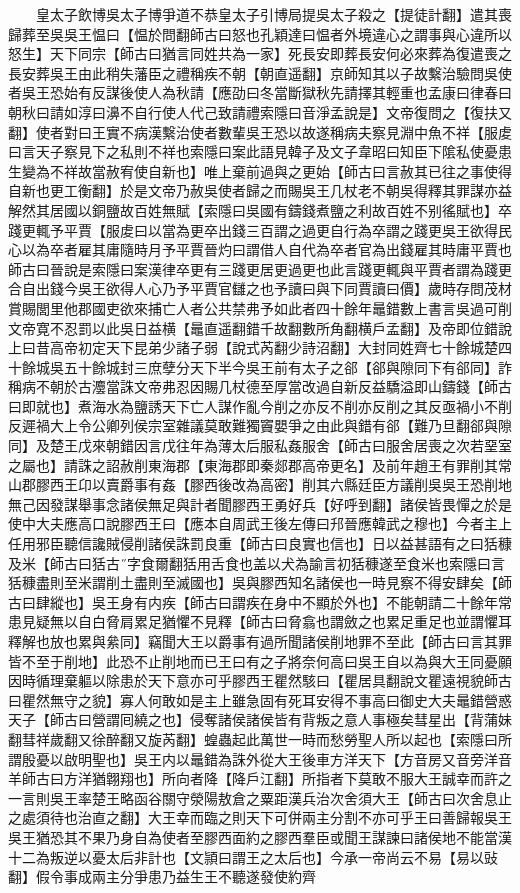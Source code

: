 　　皇太子飲博吳太子博爭道不恭皇太子引博局提吳太子殺之【提徒計翻】遣其喪歸葬至吳吳王愠曰【愠於問翻師古曰怒也孔穎達曰愠者外境違心之謂事與心違所以怒生】天下同宗【師古曰猶言同姓共為一家】死長安即葬長安何必來葬為復遣喪之長安葬吳王由此稍失藩臣之禮稱疾不朝【朝直遥翻】京師知其以子故繫治驗問吳使者吳王恐始有反謀後使人為秋請【應劭曰冬當斷獄秋先請擇其輕重也孟康曰律春曰朝秋曰請如淳曰濞不自行使人代己致請禮索隱曰音淨孟說是】文帝復問之【復扶又翻】使者對曰王實不病漢繫治使者數輩吳王恐以故遂稱病夫察見淵中魚不祥【服䖍曰言天子察見下之私則不祥也索隱曰案此語見韓子及文子韋昭曰知臣下隂私使憂患生變為不祥故當赦宥使自新也】唯上棄前過與之更始【師古曰言赦其已往之事使得自新也更工衡翻】於是文帝乃赦吳使者歸之而賜吳王几杖老不朝吳得釋其罪謀亦益解然其居國以銅鹽故百姓無賦【索隱曰吳國有鑄錢煮鹽之利故百姓不别徭賦也】卒踐更輒予平賈【服䖍曰以當為更卒出錢三百謂之過更自行為卒謂之踐更吳王欲得民心以為卒者雇其庸隨時月予平賈晉灼曰謂借人自代為卒者官為出錢雇其時庸平賈也師古曰晉說是索隱曰案漢律卒更有三踐更居更過更也此言踐更輒與平賈者謂為踐更合自出錢今吳王欲得人心乃予平賈官讎之也予讀曰與下同賈讀曰價】歲時存問茂材賞賜閭里他郡國吏欲來捕亡人者公共禁弗予如此者四十餘年鼂錯數上書言吳過可削文帝寛不忍罰以此吳日益横【鼂直遥翻錯千故翻數所角翻横戶孟翻】及帝即位錯說上曰昔高帝初定天下昆弟少諸子弱【說式芮翻少詩沼翻】大封同姓齊七十餘城楚四十餘城吳五十餘城封三庶孽分天下半今吳王前有太子之郤【郤與隙同下有郤同】詐稱病不朝於古灋當誅文帝弗忍因賜几杖德至厚當改過自新反益驕溢即山鑄錢【師古曰即就也】煮海水為鹽誘天下亡人謀作亂今削之亦反不削亦反削之其反亟禍小不削反遲禍大上令公卿列侯宗室雜議莫敢難獨竇嬰爭之由此與錯有郤【難乃旦翻郤與隙同】及楚王戊來朝錯因言戊往年為薄太后服私姦服舍【師古曰服舍居喪之次若堊室之屬也】請誅之詔赦削東海郡【東海郡即秦郯郡高帝更名】及前年趙王有罪削其常山郡膠西王卬以賣爵事有姦【膠西後改為高密】削其六縣廷臣方議削吳吳王恐削地無己因發謀舉事念諸侯無足與計者聞膠西王勇好兵【好呼到翻】諸侯皆畏憚之於是使中大夫應高口說膠西王曰【應本自周武王後左傳曰䢴晉應韓武之穆也】今者主上任用邪臣聽信讒賊侵削諸侯誅罰良重【師古曰良實也信也】日以益甚語有之曰狧穅及米【師古曰狧古字食爾翻狧用舌食也盖以犬為諭言初狧穅遂至食米也索隱曰言狧穅盡則至米謂削土盡則至滅國也】吳與膠西知名諸侯也一時見察不得安肆矣【師古曰肆縱也】吳王身有内疾【師古曰謂疾在身中不顯於外也】不能朝請二十餘年常患見疑無以自白脅肩累足猶懼不見釋【師古曰脅翕也謂斂之也累足重足也並謂懼耳釋解也放也累與絫同】竊聞大王以爵事有過所聞諸侯削地罪不至此【師古曰言其罪皆不至于削地】此恐不止削地而已王曰有之子將奈何高曰吳王自以為與大王同憂願因時循理棄軀以除患於天下意亦可乎膠西王瞿然駭曰【瞿居具翻說文瞿遠視貌師古曰瞿然無守之貌】寡人何敢如是主上雖急固有死耳安得不事高曰御史大夫鼂錯營惑天子【師古曰營謂囘繞之也】侵奪諸侯諸侯皆有背叛之意人事極矣彗星出【背蒲妹翻彗祥歲翻又徐醉翻又旋芮翻】蝗蟲起此萬世一時而愁勞聖人所以起也【索隱曰所謂殷憂以啟明聖也】吳王内以鼂錯為誅外從大王後車方洋天下【方音房又音旁洋音羊師古曰方洋猶翺翔也】所向者降【降戶江翻】所指者下莫敢不服大王誠幸而許之一言則吳王率楚王略函谷關守滎陽敖倉之粟距漢兵治次舍須大王【師古曰次舍息止之處須待也治直之翻】大王幸而臨之則天下可併兩主分割不亦可乎王曰善歸報吳王吳王猶恐其不果乃身自為使者至膠西面約之膠西羣臣或聞王謀諫曰諸侯地不能當漢十二為叛逆以憂太后非計也【文頴曰謂王之太后也】今承一帝尚云不易【易以䜴翻】假令事成兩主分爭患乃益生王不聽遂發使約齊